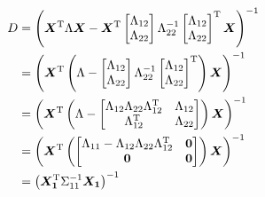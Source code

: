 \documentclass[twoside]{article}
\begin{document}
\begin{align*}
D
&=\left(
\bm{X}^\mathrm{T}\Lambda\bm{X}
-
\bm{X}^\mathrm{T}
\begin{bmatrix} 
\Lambda_{12} \\
\Lambda_{22}
\end{bmatrix}
\Lambda_{22}^{-1}
\begin{bmatrix} 
\Lambda_{12} \\
\Lambda_{22}
\end{bmatrix}^\mathrm{T}
\bm{X}
\right)^{-1}
\\&=
\left(
\bm{X}^\mathrm{T}
\left(\Lambda
-
\begin{bmatrix} 
\Lambda_{12} \\
\Lambda_{22}
\end{bmatrix}
\Lambda_{22}^{-1}
\begin{bmatrix} 
\Lambda_{12} \\
\Lambda_{22}
\end{bmatrix}^\mathrm{T}
\right)
\bm{X}
\right)^{-1}
\\&=
\left(
\bm{X}^\mathrm{T}
\left(\Lambda
-
\begin{bmatrix} 
\Lambda_{12}\Lambda_{22}\Lambda_{12}^\mathrm{T}  & \Lambda_{12}\\
\Lambda_{12}^\mathrm{T} & \Lambda_{22}
\end{bmatrix}
\right)
\bm{X}
\right)^{-1}
\\&=
\left(
\bm{X}^\mathrm{T}
\left(
\begin{bmatrix} 
\Lambda_{11} - \Lambda_{12}\Lambda_{22}\Lambda_{12}^\mathrm{T}  & \bm{0}\\
\bm{0} & \bm{0}
\end{bmatrix}
\right)
\bm{X}
\right)^{-1}
\\&=
\left(
\bm{X_1}^\mathrm{T}
\Sigma_{11}^{-1}
\bm{X_1}
\right)^{-1}
\end{align*}

\end{document}
